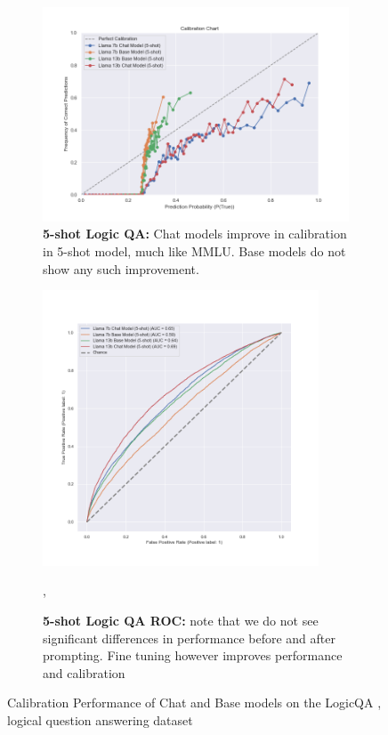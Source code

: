 \documentclass[11pt]{article}
\begin{document}
\begin{figure}
     \hfill
     \begin{subfigure}[b]{0.60\textwidth}
         \centering
         \includegraphics[width=1.0\textwidth]{figures/5-shot-logic-qa.png}
         \caption{\textbf{5-shot Logic QA:} Chat models improve in calibration in 5-shot model, much like MMLU. Base models do not show any such improvement.}
         \label{fig:5-shot-logicqa}
     \end{subfigure}     
    \hfill 
     \begin{subfigure}[b]{0.38\textwidth}
         \centering \includegraphics[width=0.9\textwidth]{figures/5-shot-logic-qa-roc.png}
         \caption{\textbf{5-shot Logic QA ROC:}  note that we do not see significant differences in performance before and after prompting. Fine tuning however improves performance and calibration},
         \label{fig:0-shot-MMLU}
    \end{subfigure} 
     
     
        \caption{Calibration Performance of Chat and Base models on the LogicQA , logical question answering dataset}
        \label{fig:three graphs}
\end{figure}
\end{document}
